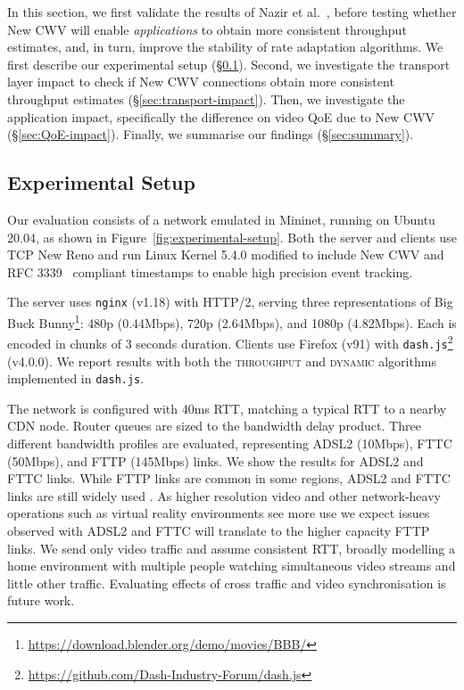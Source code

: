 \documentclass[10pt,sigconf]{acmart}
\begin{document}
In this section, we first validate the results of Nazir et al.~\cite{Nazir-2014-performance-evaluation-congestion-window-validation-dash-newcwv}, before testing whether New CWV will enable \emph{applications} to obtain more consistent throughput estimates, and, in turn, improve the stability of rate adaptation algorithms.
We first describe our experimental setup (\S\ref{sec:experimental-setup}). Second, we investigate the transport layer impact to check if New CWV connections obtain more consistent throughput estimates (\S\ref{sec:transport-impact}). Then, we investigate the application impact, specifically the difference on video QoE due to New CWV (\S\ref{sec:QoE-impact}). Finally, we summarise our findings (\S\ref{sec:summary}).

\subsection{Experimental Setup}
\label{sec:experimental-setup}

Our evaluation consists of a network emulated in Mininet, running on Ubuntu 20.04, as shown in Figure~\ref{fig:experimental-setup}. Both the server and clients use TCP New Reno and run Linux Kernel 5.4.0 modified to include New CWV and RFC 3339~\cite{rfc3339-precise-timestamps} compliant timestamps to enable high precision event tracking. 

The server uses \texttt{nginx} (v1.18) with HTTP/2, serving three representations of Big Buck Bunny\footnote{\url{https://download.blender.org/demo/movies/BBB/}}: 480p (0.44Mbps), 720p (2.64Mbps), and 1080p (4.82Mbps). Each is encoded in chunks of 3 seconds duration.
Clients use Firefox (v91) with \texttt{dash.js}\footnote{\url{https://github.com/Dash-Industry-Forum/dash.js}} (v4.0.0). We
report results with both the \textsc{throughput} and \textsc{dynamic} \cite{Spiteri-2019-from-theory-to-practice-sabre} algorithms implemented in \texttt{dash.js}.

The network is configured with 40ms RTT, matching a typical RTT to a nearby CDN node. Router queues are sized to the bandwidth delay product. Three different bandwidth profiles are evaluated, representing ADSL2 (10Mbps), FTTC (50Mbps), and FTTP (145Mbps) links. We show the results for ADSL2 and FTTC links.
While FTTP links are common in some regions, ADSL2 and FTTC links are still widely used \cite{ofcom-2020-report,FCC-measuring-broadband-america,EC-measuring-broadband-europe,ACCC-measuring-broadband-australia}. As higher resolution video and other network-heavy operations such as virtual reality environments see more use we expect issues observed with ADSL2 and FTTC will translate to the higher capacity FTTP links.
We send only video traffic and assume consistent RTT, broadly modelling a home environment with multiple people watching simultaneous video streams and little other traffic. Evaluating effects of cross traffic and video synchronisation is future work.
\end{document}
